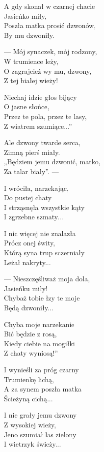 \begin{text}
    A gdy skonał w czarnej chacie\\
    Jasieńko miły,\\
    Poszła matka prosić dzwonów,\\
    By mu dzwoniły.

    — Mój synaczek, mój rodzony,\\
    W trumience leży,\\
    O zagrajcież wy mu, dzwony,\\
    Z tej białej wieży!

    Niechaj idzie głos bijący\\
    O jasne słońce,\\
    Przez te pola, przez te lasy,\\
    Z wiatrem szumiące...”

    Ale dzwony twarde serca,\\
    Zimną pierś miały.\\
    „Będziem jemu dzwonić, matko,\\
    Za talar biały”. —

    I wróciła, narzekając,\\
    Do pustej chaty\\
    I strząsnęła wszystkie kąty\\
    I zgrzebne szmaty...

    I nic więcej nie znalazła\\
    Prócz onej świty,\\
    Którą syna trup sczerniały\\
    Leżał nakryty...

    — Nieszczęśliważ moja dola,\\
    Jasieńku miły!\\
    Chybaż tobie łzy te moje\\
    Będą dzwoniły...

    Chyba moje narzekanie\\
    Bić będzie z rosą,\\
    Kiedy ciebie na mogiłki\\
    Z chaty wyniosą!”

    I wynieśli za próg czarny\\
    Trumienkę lichą,\\
    A za synem poszła matka\\
    Ścieżyną cichą...

    I nie grały jemu dzwony\\
    Z wysokiej wieży,\\
    Jeno szumiał las zielony\\
    I wietrzyk świeży...
\end{text}
\begin{chord}

\end{chord}